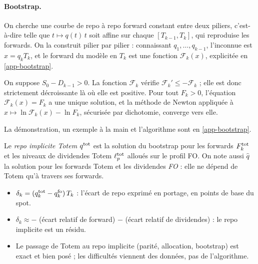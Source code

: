 \paragraph{Bootstrap.} On cherche une courbe de repo à repo forward constant entre deux piliers, c'est-à-dire telle que
$t\mapsto q(t)\,t$ soit affine sur chaque $[T_{k-1}, T_k]$, qui reproduise les forwards. On la construit pilier par
pilier : connaissant $q_1, \dots, q_{k-1}$, l'inconnue est $x=q_kT_k$, et le forward du modèle en $T_k$ est une fonction
$\mathcal F_k(x)$, explicitée en \cref{app-bootstrap}.

\begin{proposition}\label{prop-bootstrap}
On suppose $S_0-D_{k-1}>0$. La fonction $\mathcal F_k$ vérifie $\mathcal F_k'\le-\mathcal F_k$ ; elle est donc
strictement décroissante là où elle est positive. Pour tout $F_k>0$, l'équation $\mathcal F_k(x)=F_k$ a une unique
solution, et la méthode de Newton appliquée à $x\mapsto\ln\mathcal F_k(x)-\ln F_k$, sécurisée par dichotomie, converge
vers elle.
\end{proposition}
La démonstration, un exemple à la main et l'algorithme sont en \cref{app-bootstrap}.

\begin{definition}\label{def-implied}
Le \emph{repo implicite Totem} $q^{\mathrm{tot}}$ est la solution du bootstrap pour les forwards $F^{\mathrm{tot}}_k$ et les niveaux
de dividendes Totem $\ell^{\mathrm{tot}}_p$ alloués sur le profil FO. On note aussi $\hat q$ la solution pour les forwards
Totem et les dividendes \emph{FO} : elle ne dépend de Totem qu'à travers ses forwards.
\end{definition}

\begin{retenir}
\begin{itemize}[leftmargin=12pt]
\item $\delta_k=(q^{\mathrm{tot}}_k-q^{\mathrm{fo}}_k)\,T_k$ : l'écart de repo exprimé en portage, en points de base du spot.
\item $\delta_k\approx-$ (écart relatif de forward) $-$ (écart relatif de dividendes) : le repo implicite est un
résidu.
\item Le passage de Totem au repo implicite (parité, allocation, bootstrap) est exact et bien posé ; les difficultés
viennent des données, pas de l'algorithme.
\end{itemize}
\end{retenir}
